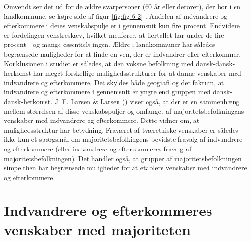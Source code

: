 \documentclass[
]{book}
\begin{document}
Omvendt ser det ud for de ældre svarpersoner (60 år eller derover), der bor i en landkommune, se højre side af figur \ref{fig:fig-6-2} . Andelen af indvandrere og efterkommere i deres venskabspulje er i gennemsnit kun fire procent. Endvidere er fordelingen venstreskæv, hvilket medfører, at flertallet har under de fire procent---og mange essentielt ingen. Ældre i landkommuner har således begrænsede muligheder for at finde en ven, der er indvandrer eller efterkommer. Konklusionen i studiet er således, at den voksne befolkning med dansk-dansk-herkomst har meget forskellige mulighedsstrukturer for at danne venskaber med indvandrere og efterkommere. Det skyldes både geografi og det faktum, at indvandrere og efterkommere i gennemsnit er yngre end gruppen med dansk-dansk-herkomst. J. F. Larsen \& Larsen () viser også, at der er en sammenhæng mellem størrelsen af disse venskabspuljer og omfanget af majoritetsbefolkningens venskaber med indvandrere og efterkommere. Dette vidner om, at mulighedsstruktur har betydning. Fraværet af tværetniske venskaber er således ikke kun et spørgsmål om majoritetsbefolkingens bevidste fravalg af indvandrere og efterkommere (eller indvandrere og efterkommeres fravalg af majoritetsbefolkningen). Det handler også, at grupper af majoritetsbefolkningen simpelthen har begrænsede muligheder for at etablere venskaber med indvandrere og efterkommere.

\section{Indvandrere og efterkommeres venskaber med majoriteten}\label{indvandrere-og-efterkommeres-venskaber-med-majoriteten}
\end{document}
